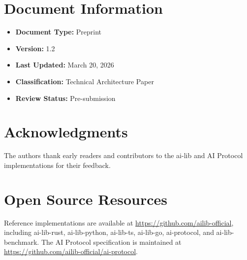 \section*{Document Information}

\begin{itemize}[leftmargin=1.5em]
  \item \textbf{Document Type:} Preprint
  \item \textbf{Version:} 1.2
  \item \textbf{Last Updated:} March 20, 2026
  \item \textbf{Classification:} Technical Architecture Paper
  \item \textbf{Review Status:} Pre-submission
\end{itemize}

\section*{Acknowledgments}

The authors thank early readers and contributors to the ai-lib and AI Protocol implementations for their feedback.

\section*{Open Source Resources}

Reference implementations are available at \url{https://github.com/ailib-official}, including ai-lib-rust, ai-lib-python, ai-lib-ts, ai-lib-go, ai-protocol, and ai-lib-benchmark. The AI Protocol specification is maintained at \url{https://github.com/ailib-official/ai-protocol}.
